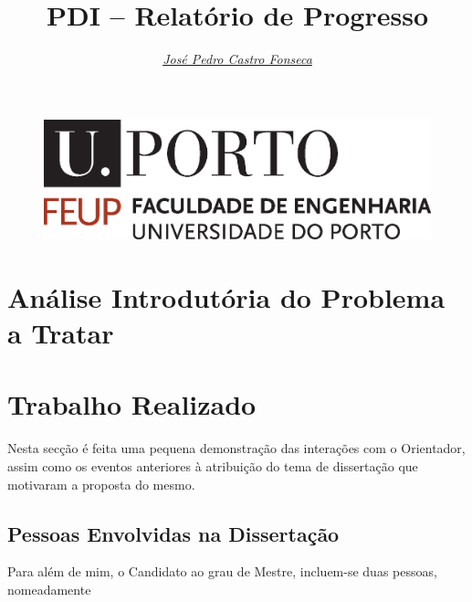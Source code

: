 \documentclass[a4paper, onecolumn, 10pt]{article}
\title{\Huge PDI -- Relatório de Progresso}
\author{\itshape \href{mailto:ee11126@fe.up.pt}{José Pedro Castro Fonseca}   }
\begin{document}
\pagestyle{plain}

\begin{figure}
	\centering
	\includegraphics[scale=0.3]{logo_feup.eps}
\end{figure}
\sffamily
\maketitle



\rmfamily\pagestyle{fancy}
\section{Análise Introdutória do Problema a Tratar}

\section{Trabalho Realizado}
Nesta secção é feita uma pequena demonstração das interações com o Orientador, assim como os eventos anteriores à atribuição do tema de dissertação que motivaram a proposta do mesmo.

	\subsection{Pessoas Envolvidas na Dissertação}
	Para além de mim, o Candidato ao grau de Mestre, incluem-se duas pessoas, nomeadamente
\end{document}
